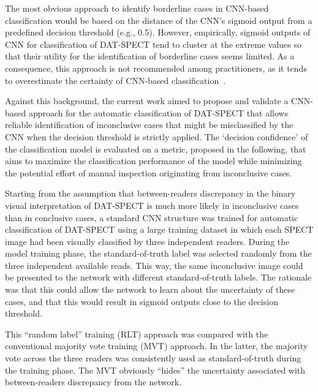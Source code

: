 
The most obvious approach to identify borderline cases in CNN-based classification would be based on the distance of the CNN's sigmoid output from a predefined decision threshold (e.g., 0.5). 
However, empirically, sigmoid outputs of CNN for classification of DAT-SPECT tend to cluster at the extreme values so that their utility for the identification of borderline cases seems limited.  
As a consequence, this approach is not recommended among practitioners, as it tends to overestimate the certainty of CNN-based classification~\citep{Ulmer2021, Guo2017, Karimi2020}.


Against this background, the current work aimed to propose and validate a CNN-based approach for the automatic classification of DAT-SPECT 
that allows reliable identification of inconclusive cases that might be misclassified by the CNN when the decision threshold is strictly applied.
The `decision confidence' of the classification model is evaluated on a metric, proposed in the following, 
that aims to maximize the classification performance of the model
while minimizing the potential effort of manual inspection originating from inconclusive cases.

Starting from the assumption that between-readers discrepancy in the binary visual interpretation of DAT-SPECT is much more likely in inconclusive cases 
than in conclusive cases, a standard CNN structure was trained for automatic classification of DAT-SPECT using a large training dataset in which each 
SPECT image had been visually classified by three independent readers. 
During the model training phase, the standard-of-truth label was selected randomly from the three independent available reads. 
This way, the same inconclusive image could be presented to the network with different standard-of-truth labels. 
The rationale was that this could allow the network to learn about the uncertainty of these cases, 
and that this would result in sigmoid outputs close to the decision threshold.

This “random label” training (RLT) approach was compared with the conventional majority vote training (MVT) approach. 
In the latter,  the majority vote across the three readers was consistently used as standard-of-truth during the training phase. 
The MVT obviously “hides” the uncertainty associated with between-readers discrepancy from the network. 

